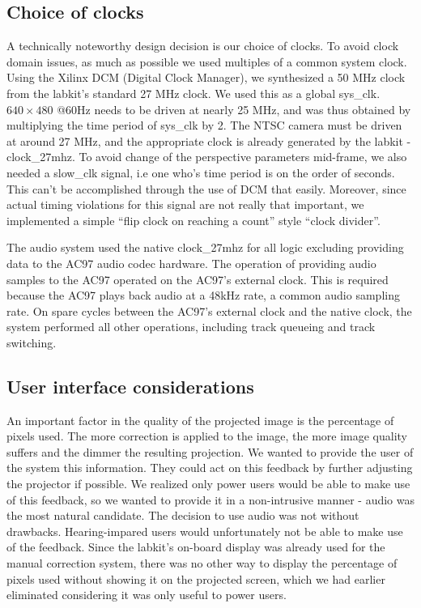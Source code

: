 \documentclass{article}
\begin{document}
\subsection{Choice of clocks}
A technically noteworthy design decision is our choice of clocks.
To avoid clock domain issues, as much as possible we used multiples of a common system clock.
Using the Xilinx DCM (Digital Clock Manager), we synthesized a 50 MHz clock from the labkit's standard 27 MHz clock.
We used this as a global sys\_clk.
$640 \times 480$ @60Hz needs to be driven at nearly 25 MHz, and was thus obtained by multiplying the time period of sys\_clk by 2.
The NTSC camera must be driven at around 27 MHz, and the appropriate clock is already generated by the labkit - clock\_27mhz.
To avoid change of the perspective parameters mid-frame, we also needed a slow\_clk signal,
i.e one who's time period is on the order of seconds.
This can't be accomplished through the use of DCM that easily.
Moreover, since actual timing violations for this signal are not really that important,
we implemented a simple ``flip clock on reaching a count'' style ``clock divider''.

The audio system used the native clock\_27mhz for all logic excluding providing data to the AC97 audio codec hardware.
The operation of providing audio samples to the AC97 operated on the AC97's external clock.
This is required because the AC97 plays back audio at a 48kHz rate, a common audio sampling rate.
On spare cycles between the AC97's external clock and the native clock, the system performed all other operations, including track queueing and track switching.

\subsection{User interface considerations}
An important factor in the quality of the projected image is the percentage of pixels used.
The more correction is applied to the image, the more image quality suffers and the dimmer the resulting projection.
We wanted to provide the user of the system this information.
They could act on this feedback by further adjusting the projector if possible.
We realized only power users would be able to make use of this feedback, so we wanted to provide it in a non-intrusive manner - audio was the most natural candidate.
The decision to use audio was not without drawbacks.
Hearing-impared users would unfortunately not be able to make use of the feedback.
Since the labkit's on-board display was already used for the manual correction system,
there was no other way to display the percentage of pixels used without showing it on the projected screen,
which we had earlier eliminated considering it was only useful to power users.
\end{document}
